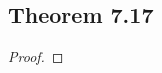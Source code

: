 \documentclass[../../main.tex]{subfiles}
\begin{document}
\subsection{Theorem 7.17}
\begin{wts}

\end{wts}
\begin{proof}

\end{proof}
\end{document}
